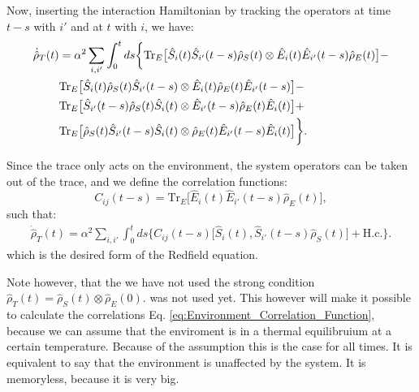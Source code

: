 Now, inserting the interaction Hamiltonian by tracking the operators at time $t - s$ with $i'$ and at $t$ with $i$, we have:
\begin{align}
	\dot{\hat{\rho}}_T(t) & = \alpha^2  \sum_{i, i'} \int_0^t ds
	\bigg\{
	\mathrm{Tr}_E \big[ \hat{S}_i(t) \hat{S}_{i'}(t-s) \hat{\rho}_S(t)      \otimes   \hat{E}_{i}(t) \hat{E}_{i'}(t-s) \hat{\rho}_E(t)  \big] -  \notag                         \\
	                      & \mathrm{Tr}_E \big[ \hat{S}_i(t) \hat{\rho}_S(t) \hat{S}_{i'}(t-s)      \otimes   \hat{E}_{i}(t) \hat{\rho}_E(t) \hat{E}_{i'}(t-s)  \big] - \notag  \\
	                      & \mathrm{Tr}_E \big[ \hat{S}_{i'}(t-s) \hat{\rho}_S(t) \hat{S}_i(t)      \otimes   \hat{E}_{i'}(t-s) \hat{\rho}_E(t) \hat{E}_{i}(t)  \big] +  \notag \\
	                      & \mathrm{Tr}_E \big[ \hat{\rho}_S(t) \hat{S}_{i'}(t-s) \hat{S}_i(t)      \otimes   \hat{\rho}_E(t) \hat{E}_{i'}(t-s) \hat{E}_{i}(t)  \big]
	\bigg\}.
	\label{eq:Interaction_Hamiltonian_Expansion}
\end{align}

Since the trace only acts on the environment, the system operators can be taken out of the trace, and we define the correlation functions:
\begin{equation}
	C_{ij}(t - s) = \mathrm{Tr}_E \big[\hat{E}_{i}(t) \hat{E}_{i'}(t-s) \hat{\rho}_E(t)\big],
	\label{eq:Environment_Correlation_Function}
\end{equation}
such that:
\begin{align}
	\dot{\hat{\rho}}_T(t) = \alpha^2  \sum_{i, i'} \int_0^t ds
	\bigg\{
	C_{ij}(t - s) \big[ \hat{S}_i(t),  \hat{S}_{i'}(t-s) \hat{\rho}_S(t) \big] + \text{H.c.}
	\bigg\}.
	\label{eq:Redfield_Equation_Final}
\end{align}
which is the desired form of the Redfield equation.

Note however, that the we have not used the strong condition $\hat{\rho}_T(t) = \hat{\rho}_S(t) \otimes \hat{\rho}_E(0)$. was not used yet.
This however will make it possible to calculate the correlations Eq. \eqref{eq:Environment_Correlation_Function}, because we can assume that the enviroment is in a thermal equilibruium at a certain temperature.
Because of the assumption this is the case for all times.
It is equivalent to say that the environment is unaffected by the system. It is memoryless, because it is very big.